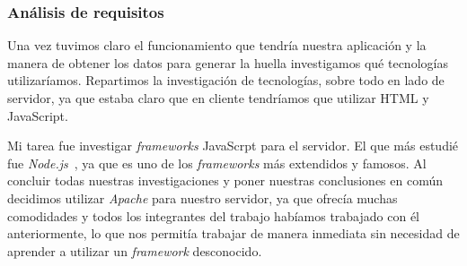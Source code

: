 \subsubsection{Análisis de requisitos}
Una vez tuvimos claro el funcionamiento que tendría nuestra aplicación y la manera de obtener los datos para generar la huella investigamos qué tecnologías utilizaríamos. Repartimos la investigación de tecnologías, sobre todo en lado de servidor, ya que estaba claro que en cliente tendríamos que utilizar HTML y JavaScript.\par
Mi tarea fue investigar \textit{frameworks} JavaScrpt para el servidor. El que más estudié fue \textit{Node.js}~\cite{nodejs}, ya que es uno de los \textit{frameworks} más extendidos y famosos. Al concluir todas nuestras investigaciones y poner nuestras conclusiones en común decidimos utilizar \textit{Apache} para nuestro servidor, ya que ofrecía muchas comodidades y todos los integrantes del trabajo habíamos trabajado con él anteriormente, lo que nos permitía trabajar de manera inmediata sin necesidad de aprender a utilizar un \textit{framework} desconocido.
